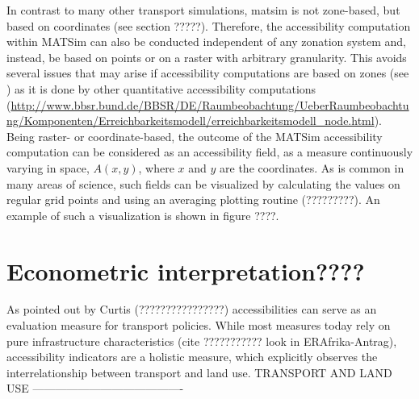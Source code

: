 In contrast to many other transport simulations, \gls{matsim} is not zone-based, but based on coordinates (see section ?????). Therefore, the accessibility computation within MATSim can also be conducted independent of any zonation system and, instead, be based on points or on a raster with arbitrary granularity. This avoids several issues that may arise if accessibility computations are based on zones (see \citep[e.g.,][]{NicolaiNagel2012HiResAccessibilityMethodInBook}) as it is done by other quantitative accessibility computations 
%
%
(\url{http://www.bbsr.bund.de/BBSR/DE/Raumbeobachtung/UeberRaumbeobachtung/Komponenten/Erreichbarkeitsmodell/erreichbarkeitsmodell_node.html}). Being raster- or coordinate-based, the outcome of the MATSim accessibility computation can be considered as an accessibility field,
\ie as a measure continuously varying in space, $A(x,y)$, where $x$ and $y$
are the coordinates. As is common in many areas of science, such
fields can be visualized by calculating the values on regular grid
points and using an averaging plotting routine (?????????). An example of such a visualization is shown in figure ????.




\section{Econometric interpretation????}

As pointed out by Curtis (????????????????) accessibilities can serve as an evaluation measure for transport policies. While most measures today rely on pure infrastructure characteristics (cite ??????????? look in ERAfrika-Antrag), accessibility indicators are a holistic measure, which explicitly observes the interrelationship between transport and land use.
TRANSPORT AND LAND USE ----------------------------------------


